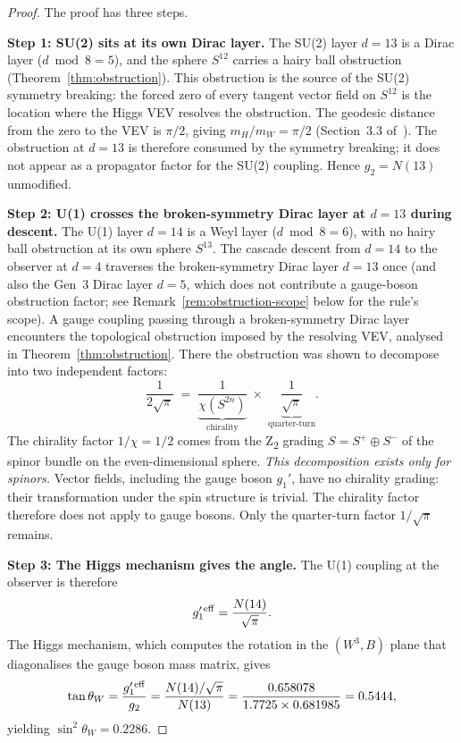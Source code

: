 \documentclass[12pt,a4paper]{article}
\begin{document}
\begin{proof}
The proof has three steps.

\textbf{Step 1: SU(2) sits at its own Dirac layer.}
The SU(2) layer $d=13$ is a Dirac layer ($d\bmod 8 = 5$), and the sphere
$S^{12}$ carries a hairy ball obstruction (Theorem~\ref{thm:obstruction}).
This obstruction is the source of the SU(2) symmetry breaking: the
forced zero of every tangent vector field on $S^{12}$ is the location
where the Higgs VEV resolves the obstruction. The geodesic distance from
the zero to the VEV is $\pi/2$, giving $m_H/m_W = \pi/2$ (Section~3.3
of~\cite{part4a}). The obstruction at $d=13$ is therefore consumed by
the symmetry breaking; it does not appear as a propagator factor for the
SU(2) coupling. Hence $g_2 = N(13)$ unmodified.

\textbf{Step 2: U(1) crosses the broken-symmetry Dirac layer at $d=13$ during descent.}
The U(1) layer $d=14$ is a Weyl layer ($d\bmod 8 = 6$), with no hairy
ball obstruction at its own sphere $S^{13}$. The cascade descent from
$d=14$ to the observer at $d=4$ traverses the broken-symmetry Dirac
layer $d=13$ once (and also the Gen~3 Dirac layer $d=5$, which does
not contribute a gauge-boson obstruction factor; see
Remark~\ref{rem:obstruction-scope} below for the rule's scope).
A gauge coupling passing through a broken-symmetry Dirac layer
encounters the topological obstruction imposed by the resolving VEV,
analysed in Theorem~\ref{thm:obstruction}. There the
obstruction was shown to decompose into two independent factors:
\[
\frac{1}{2\sqrt{\pi}}
\;=\;
\underbrace{\frac{1}{\chi(S^{2n})}}_{\text{chirality}}
\;\times\;
\underbrace{\frac{1}{\sqrt{\pi}}}_{\text{quarter-turn}}.
\]
The chirality factor $1/\chi = 1/2$ comes from the Z\textsubscript{2}
grading $S = S^+\oplus S^-$ of the spinor bundle on the
even-dimensional sphere. \emph{This decomposition exists only for
spinors.} Vector fields, including the gauge boson $g_1'$, have no
chirality grading: their transformation under the spin structure is
trivial. The chirality factor therefore does not apply to gauge bosons.
Only the quarter-turn factor $1/\sqrt{\pi}$ remains.

\textbf{Step 3: The Higgs mechanism gives the angle.}
The U(1) coupling at the observer is therefore
\[
g_1'^{\,\rm eff} = \frac{N(14)}{\sqrt{\pi}}.
\]
The Higgs mechanism, which computes the rotation in the $(W^3, B)$
plane that diagonalises the gauge boson mass matrix, gives
\[
\tan\theta_W = \frac{g_1'^{\,\rm eff}}{g_2}
= \frac{N(14)/\sqrt{\pi}}{N(13)}
= \frac{0.658078}{1.7725 \times 0.681985}
= 0.5444,
\]
yielding $\sin^2\theta_W = 0.2286$.
\end{proof}
\end{document}
